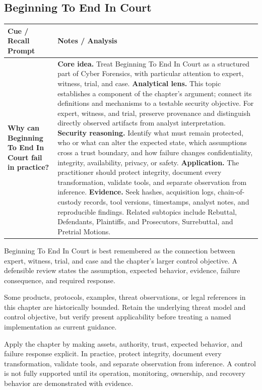 \documentclass[11pt]{article}
\newcommand{\CornellHeader}{%
\rowcolor{Navy}\color{white}\bfseries Cue / Recall Prompt & \color{white}\bfseries Notes / Analysis\\\hline}
\newcommand{\CornellRow}[2]{%
\cellcolor{CueGray}\RaggedRight\textbf{#1} & \RaggedRight #2\\\hline}
\begin{document}
\subsection*{Beginning To End In Court}
\begin{longtable}{>{\RaggedRight\arraybackslash}p{}|>{\RaggedRight\arraybackslash}p{}}
\CornellHeader
\CornellRow{Why can Beginning To End In Court fail in practice?}{\textbf{Core idea.} Treat Beginning To End In Court as a structured part of Cyber Forensics, with particular attention to expert, witness, trial, and case. \textbf{Analytical lens.} This topic establishes a component of the chapter's argument; connect its definitions and mechanisms to a testable security objective. For expert, witness, and trial, preserve provenance and distinguish directly observed artifacts from analyst interpretation. \textbf{Security reasoning.} Identify what must remain protected, who or what can alter the expected state, which assumptions cross a trust boundary, and how failure changes confidentiality, integrity, availability, privacy, or safety. \textbf{Application.} The practitioner should protect integrity, document every transformation, validate tools, and separate observation from inference. \textbf{Evidence.} Seek hashes, acquisition logs, chain-of-custody records, tool versions, timestamps, analyst notes, and reproducible findings. Related subtopics include Rebuttal, Defendants, Plaintiffs, and Prosecutors, Surrebuttal, and Pretrial Motions.}
\end{longtable}
\begin{topicsummary}
Beginning To End In Court is best remembered as the connection between expert, witness, trial, and case and the chapter's larger control objective. A defensible review states the assumption, expected behavior, evidence, failure consequence, and required response.
\end{topicsummary}
\begin{historybox}
Some products, protocols, examples, threat observations, or legal references in this chapter are historically bounded. Retain the underlying threat model and control objective, but verify present applicability before treating a named implementation as current guidance.
\end{historybox}
\begin{defensebox}
Apply the chapter by making assets, authority, trust, expected behavior, and failure response explicit. In practice, protect integrity, document every transformation, validate tools, and separate observation from inference. A control is not fully supported until its operation, monitoring, ownership, and recovery behavior are demonstrated with evidence.
\end{defensebox}
\end{document}
